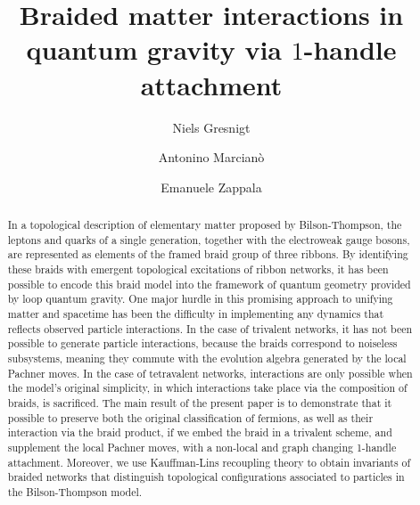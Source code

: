 \documentclass[aps,nofootinbib,amsfonts,superscriptaddress]{revtex4}
\begin{document}
\author{Niels Gresnigt}

\author{Antonino Marcian\`o}

\author{Emanuele Zappala}

\title{Braided matter interactions in quantum gravity via $1$-handle attachment}


\begin{abstract}
\noindent
In a topological description of elementary matter proposed by Bilson-Thompson, the leptons and quarks of a single generation, together with the electroweak gauge bosons, are represented as elements of the framed braid group of three ribbons. By identifying these braids with emergent topological excitations of ribbon networks, it has been possible to encode this braid model into the framework of quantum geometry provided by loop quantum gravity. One major hurdle in this promising approach to unifying matter and spacetime has been the difficulty in implementing any dynamics that reflects observed particle interactions. In the case of trivalent networks, it has not been possible to generate particle interactions, because the braids correspond to noiseless subsystems, meaning they commute with the evolution algebra generated by the local Pachner moves. In the case of tetravalent networks, interactions are only possible when the model's original simplicity, in which interactions take place via the composition of braids, is sacrificed. The main result of the present paper is to demonstrate that it possible to preserve both the original classification of fermions, as well as their interaction via the braid product, if we embed the braid in a trivalent scheme, and supplement the local Pachner moves, with a non-local and graph changing 1-handle attachment. Moreover, we use Kauffman-Lins recoupling theory to obtain invariants of braided networks that distinguish topological configurations associated to particles in the Bilson-Thompson model.

\end{abstract}
\end{document}

